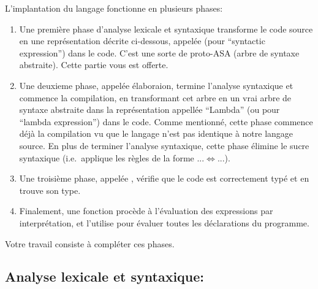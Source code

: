 \documentclass{article}
\begin{document}
L'implantation du langage fonctionne en plusieurs phases:
\begin{enumerate}
\item Une première phase d'analyse lexicale et syntaxique transforme le code
  source en une représentation décrite ci-dessous, appelée  (pour
  ``syntactic expression'') dans le code.  C'est une sorte de
  proto-ASA (arbre de syntaxe abstraite).  Cette partie vous est offerte.
\item Une deuxieme phase, appelée élaboraion, termine l'analyse syntaxique et
  commence la compilation, en transformant cet arbre en un vrai arbre de
  syntaxe abstraite dans la représentation appellée ``Lambda'' (ou 
  pour ``lambda expression'') dans le code.  Comme mentionné, cette phase
  commence déjà la compilation vu que le langage  n'est pas
  identique à notre langage source.  En plus de terminer l'analyse
  syntaxique, cette phase élimine le sucre syntaxique (i.e.~applique les
  règles de la forme $...\Longleftrightarrow...$).
\item Une troisième phase, appelée , vérifie que le code est
  correctement typé et en trouve son type.
\item Finalement, une fonction  procède à l'évaluation des
  expressions par interprétation, et  l'utilise pour
  évaluer toutes les déclarations du programme.
\end{enumerate}

Votre travail consiste à compléter ces phases.

\subsection{Analyse lexicale et syntaxique: }
\end{document}
